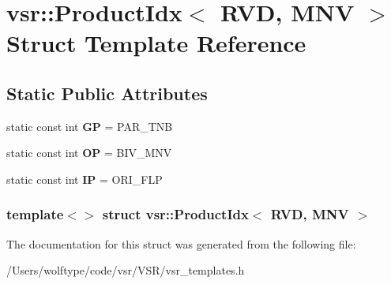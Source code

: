 \hypertarget{structvsr_1_1_product_idx_3_01_r_v_d_00_01_m_n_v_01_4}{\section{vsr\-:\-:Product\-Idx$<$ R\-V\-D, M\-N\-V $>$ Struct Template Reference}
\label{structvsr_1_1_product_idx_3_01_r_v_d_00_01_m_n_v_01_4}
}
\subsection*{Static Public Attributes}
\begin{DoxyCompactItemize}
\item 
\hypertarget{structvsr_1_1_product_idx_3_01_r_v_d_00_01_m_n_v_01_4_a581e3b6b114d778ea657545596c1a190}{static const int {\bfseries G\-P} = P\-A\-R\-\_\-\-T\-N\-B}\label{structvsr_1_1_product_idx_3_01_r_v_d_00_01_m_n_v_01_4_a581e3b6b114d778ea657545596c1a190}

\item 
\hypertarget{structvsr_1_1_product_idx_3_01_r_v_d_00_01_m_n_v_01_4_a03068adcdb9e92e0fea6d9b69c66acab}{static const int {\bfseries O\-P} = B\-I\-V\-\_\-\-M\-N\-V}\label{structvsr_1_1_product_idx_3_01_r_v_d_00_01_m_n_v_01_4_a03068adcdb9e92e0fea6d9b69c66acab}

\item 
\hypertarget{structvsr_1_1_product_idx_3_01_r_v_d_00_01_m_n_v_01_4_ad522c9aeb9d1a9d3c1562508122ff448}{static const int {\bfseries I\-P} = O\-R\-I\-\_\-\-F\-L\-P}\label{structvsr_1_1_product_idx_3_01_r_v_d_00_01_m_n_v_01_4_ad522c9aeb9d1a9d3c1562508122ff448}

\end{DoxyCompactItemize}
\subsubsection*{template$<$$>$ struct vsr\-::\-Product\-Idx$<$ R\-V\-D, M\-N\-V $>$}



The documentation for this struct was generated from the following file\-:\begin{DoxyCompactItemize}
\item 
/\-Users/wolftype/code/vsr/\-V\-S\-R/vsr\-\_\-templates.\-h\end{DoxyCompactItemize}
